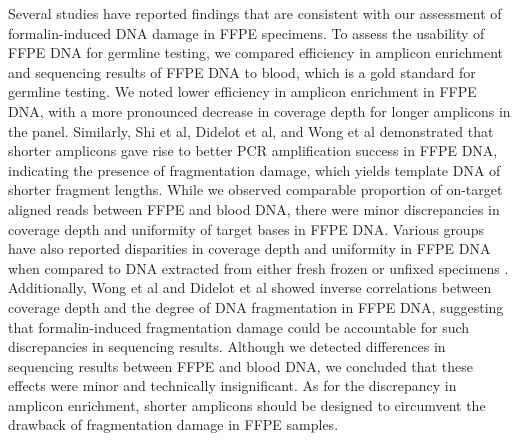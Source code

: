 Several studies have reported findings that are consistent with our assessment of formalin-induced DNA damage in FFPE specimens. To assess the usability of FFPE DNA for germline testing, we compared efficiency in amplicon enrichment and sequencing results of FFPE DNA to blood, which is a gold standard for germline testing. We noted lower efficiency in amplicon enrichment in FFPE DNA, with a more pronounced decrease in coverage depth for longer amplicons in the panel. Similarly, Shi et al\cite{Shi2002}, Didelot et al\cite{Didelot2013}, and Wong et al\cite{Wong2013} demonstrated that shorter amplicons gave rise to better PCR amplification success in FFPE DNA, indicating the presence of fragmentation damage, which yields template DNA of shorter fragment lengths. While we observed comparable proportion of on-target aligned reads between FFPE and blood DNA, there were minor discrepancies in coverage depth and uniformity of target bases in FFPE DNA. Various groups have also reported disparities in coverage depth and uniformity in FFPE DNA when compared to DNA extracted from either fresh frozen or unfixed specimens \cite{Wong2013, Betge2015, Spencer2013}. Additionally, Wong et al \cite{Wong2014} and Didelot et al \cite{Didelot2013} showed inverse correlations between coverage depth and the degree of DNA fragmentation in FFPE DNA, suggesting that formalin-induced fragmentation damage could be accountable for such discrepancies in sequencing results. Although we detected differences in sequencing results between FFPE and blood DNA, we concluded that these effects were minor and technically insignificant. As for the discrepancy in amplicon enrichment, shorter amplicons should be designed to circumvent the drawback of fragmentation damage in FFPE samples.

